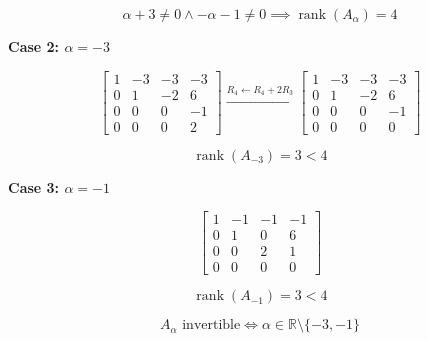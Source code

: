\begin{answer}
    $$
    \alpha+3\neq0
    \land
    -\alpha-1\neq0
    \implies
    \operatorname{rank}(A_\alpha)=4
    $$

    \textbf{Case 2: $\alpha=-3$}

    $$
    \begin{bmatrix}
        1 & -3 & -3 & -3\\
        0 & 1 & -2 & 6\\
        0 & 0 & 0 & -1\\
        0 & 0 & 0 & 2
    \end{bmatrix}
    \xrightarrow{R_4\leftarrow R_4+2R_3}
    \begin{bmatrix}
        1 & -3 & -3 & -3\\
        0 & 1 & -2 & 6\\
        0 & 0 & 0 & -1\\
        0 & 0 & 0 & 0
    \end{bmatrix}
    $$

    $$
    \operatorname{rank}(A_{-3})=3<4
    $$

    \textbf{Case 3: $\alpha=-1$}

    $$
    \begin{bmatrix}
        1 & -1 & -1 & -1\\
        0 & 1 & 0 & 6\\
        0 & 0 & 2 & 1\\
        0 & 0 & 0 & 0
    \end{bmatrix}
    $$

    $$
    \operatorname{rank}(A_{-1})=3<4
    $$

    $$
    \boxed{
        A_\alpha\text{ invertible}
        \iff
        \alpha\in\mathbb{R}\setminus\{-3,-1\}
    }
    $$
\end{answer}
